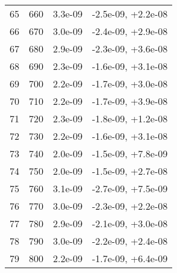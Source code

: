 \begin{table}
\begin{adjustbox}{width=1\textwidth/2}
\begin{tabular}{|c|c|c|c|}
\cline{1-4}
65 & 660 & 3.3e-09 & -2.5e-09, +2.2e-08 \\
\cline{1-4}
66 & 670 & 3.0e-09 & -2.4e-09, +2.9e-08 \\
\cline{1-4}
67 & 680 & 2.9e-09 & -2.3e-09, +3.6e-08 \\
\cline{1-4}
68 & 690 & 2.3e-09 & -1.6e-09, +3.1e-08 \\
\cline{1-4}
69 & 700 & 2.2e-09 & -1.7e-09, +3.0e-08 \\
\cline{1-4}
70 & 710 & 2.2e-09 & -1.7e-09, +3.9e-08 \\
\cline{1-4}
71 & 720 & 2.3e-09 & -1.8e-09, +1.2e-08 \\
\cline{1-4}
72 & 730 & 2.2e-09 & -1.6e-09, +3.1e-08 \\
\cline{1-4}
73 & 740 & 2.0e-09 & -1.5e-09, +7.8e-09 \\
\cline{1-4}
74 & 750 & 2.0e-09 & -1.5e-09, +2.7e-08 \\
\cline{1-4}
75 & 760 & 3.1e-09 & -2.7e-09, +7.5e-09 \\
\cline{1-4}
76 & 770 & 3.0e-09 & -2.3e-09, +2.2e-08 \\
\cline{1-4}
77 & 780 & 2.9e-09 & -2.1e-09, +3.0e-08 \\
\cline{1-4}
78 & 790 & 3.0e-09 & -2.2e-09, +2.4e-08 \\
\cline{1-4}
79 & 800 & 2.2e-09 & -1.7e-09, +6.4e-09 \\
\cline{1-4}
\end{tabular}
\end{adjustbox}
\end{table}


